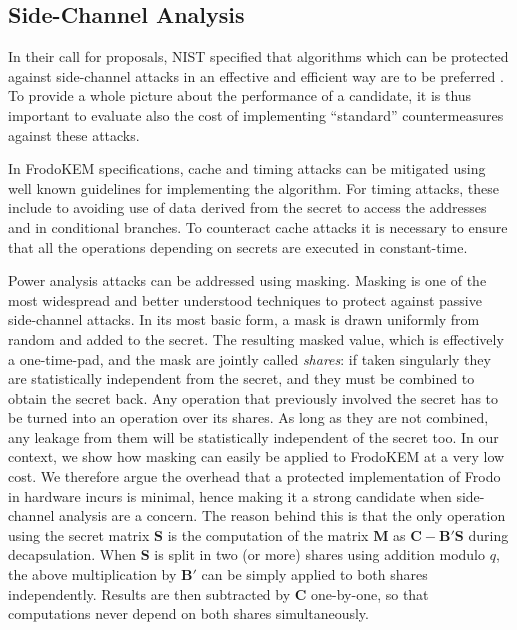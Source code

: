 \subsection{Side-Channel Analysis} \label{sec:mask}

In their call for proposals, NIST specified that algorithms which can be protected against side-channel attacks in an effective and efficient way are to be preferred \cite{nistsca}. To provide a whole picture about the performance of a candidate, it is thus important to evaluate also the cost of implementing ``standard'' countermeasures against these attacks.

In FrodoKEM specifications, cache and timing attacks can be mitigated using well known guidelines for implementing the algorithm. 
For timing attacks, these include to avoiding use of data derived from the secret to access the addresses and in conditional branches.
To counteract cache attacks it is necessary to ensure that all the operations depending on secrets are executed in constant-time.

Power analysis attacks can be addressed using masking. Masking is one of the most widespread and better understood techniques to protect
against passive side-channel attacks. In its most basic form, a mask is drawn uniformly from random and added to the secret. The resulting masked value, which is effectively a one-time-pad, and the mask are jointly called \emph{shares}: if taken
singularly they are statistically independent from the secret, and they must be combined to obtain the secret back. Any operation that previously involved the secret has to be turned into an operation over its shares. As long as they are not combined, any leakage from them will be statistically independent of the secret too. In our context, we show how masking can easily be applied to FrodoKEM at a very low cost. We therefore argue the overhead that a protected implementation of Frodo in hardware incurs is minimal, hence making it a strong candidate when side-channel analysis are a concern. The reason behind this is that the only operation using the secret matrix $\mathbf{S}$ is the computation of the matrix $\mathbf{M}$ as $\mathbf{C} - \mathbf{B}'\mathbf{S}$ during decapsulation. When $\mathbf{S}$ is split in two (or more) shares using addition modulo $q$, the above multiplication by $\mathbf{B}'$ can be simply applied to both shares independently. Results are then subtracted by $\mathbf{C}$ one-by-one, so that computations never depend on both shares simultaneously.
